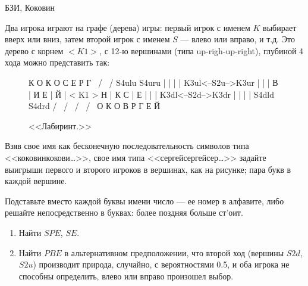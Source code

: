 \begin{problem}[<<Лабиринт>>.]
\begin{source}
БЗИ, Коковин
\end{source}  Два игрока играют на графе
(дерева) игры: первый игрок с именем $K$ выбирает вверх или
вниз, затем второй игрок с именем $S$ --- влево или вправо, и
т.д. Это дерево с корнем $<K1>$, с 12-ю вершинами (типа
up-righ-up-right), глубиной 4 хода можно представить так:

\begin{figure}[ht]
 К   О        К    О
 С   Е        Р    Г
  \  /         \  /
  S4ulu       S4uru
    |           |
    |           |
   K3ul<--S2u-->K3ur
    |     |     |
    В     |     И
    Е     |     Й
          |
        < K1 >
    Н     |     К
    С     |     Е
    |     |     |
   K3dl<--S2d-->K3dr
    |           |
    |           |
  S4dld        S4drd
  /  \         /  \
 /    \       /    \
О     К      О      В
Р     Г      Е      Й
\caption{<<Лабиринт.>>}
\end{figure}

Взяв свое имя как бесконечную последовательность символов
типа <<коковинкокови\ldots >>, свое имя типа
<<сергейсергейсер\ldots >> задайте выигрыши первого и второго
игроков в вершинах, как на рисунке; пара букв в каждой
вершине.

Подставьте вместо каждой буквы имени число --- ее номер в
алфавите, либо решайте непосредственно в буквах: более
поздняя больше ст'оит.

\begin{enumerate}

\item Найти $SPE$, $SE$. 

\item Найти $PBE$ в альтернативном
предположении, что второй ход (вершины $S2d$, $S2u$)
производит природа, случайно, с вероятностями 0.5, и оба
игрока не способны определить, влево или вправо произошел
выбор.
\end{enumerate}





\begin{sol}

\end{sol}
\end{problem}





